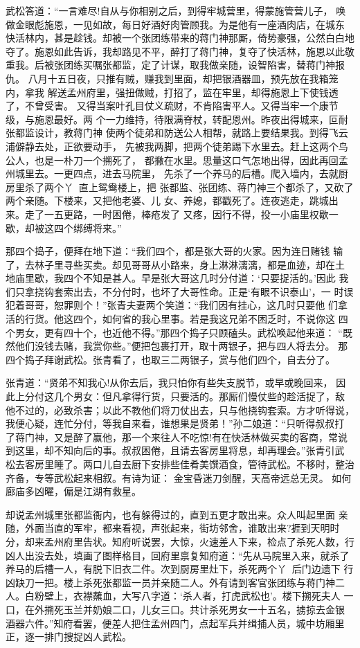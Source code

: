 武松答道：“一言难尽!自从与你相别之后，到得牢城营里，得蒙施管营儿子，
唤做金眼彪施恩，一见如故，每日好酒好肉管顾我。为是他有一座酒肉店，在城东
快活林内，甚是趁钱。却被一个张团练带来的蒋门神那厮，倚势豪强，公然白白地
夺了。施恩如此告诉，我却路见不平，醉打了蒋门神，复夺了快活林，施恩以此敬
重我。后被张团练买嘱张都监，定了计谋，取我做亲随，设智陷害，替蒋门神报仇。
八月十五日夜，只推有贼，赚我到里面，却把银酒器皿，预先放在我箱笼内，拿我
解送孟州府里，强扭做贼，打招了，监在牢里，却得施恩上下使钱透了，不曾受害。
又得当案叶孔目仗义疏财，不肯陷害平人。又得当牢一个康节级，与施恩最好。两
个一力维持，待限满脊杖，转配恩州。昨夜出得城来，叵耐张都监设计，教蒋门神
使两个徒弟和防送公人相帮，就路上要结果我。到得飞云浦僻静去处，正欲要动手，
先被我两脚，把两个徒弟踢下水里去。赶上这两个鸟公人，也是一朴刀一个搠死了，
都撇在水里。思量这口气怎地出得，因此再回孟州城里去。一更四点，进去马院里，
先杀了一个养马的后槽。爬入墙内，去就厨房里杀了两个丫，直上鸳鸯楼上，把
张都监、张团练、蒋门神三个都杀了，又砍了两个亲随。下楼来，又把他老婆、儿
女、养媳，都戳死了。连夜逃走，跳城出来。走了一五更路，一时困倦，棒疮发了
又疼，因行不得，投一小庙里权歇一歇，却被这四个绑缚将来。”

那四个捣子，便拜在地下道：“我们四个，都是张大哥的火家。因为连日赌钱
输了，去林子里寻些买卖。却见哥哥从小路来，身上淋淋漓漓，都是血迹，却在土
地庙里歇，我四个不知是甚人。早是张大哥这几时分付道：‘只要捉活的。’因此
我们只拿挠钩套索出去，不分付时，也坏了大哥性命。正是‘有眼不识泰山’，一
时误犯着哥哥，恕罪则个！”张青夫妻两个笑道：“我们因有挂心，这几时只要他
们拿活的行货。他这四个，如何省的我心里事。若是我这兄弟不困乏时，不说你这
四个男女，更有四十个，也近他不得。”那四个捣子只顾磕头。武松唤起他来道：
“既然他们没钱去赌，我赏你些。”便把包裹打开，取十两银子，把与四人将去分。
那四个捣子拜谢武松。张青看了，也取三二两银子，赏与他们四个，自去分了。

张青道：“贤弟不知我心!从你去后，我只怕你有些失支脱节，或早或晚回来，
因此上分付这几个男女：但凡拿得行货，只要活的。那厮们慢仗些的趁活捉了，敌
他不过的，必致杀害；以此不教他们将刀仗出去，只与他挠钩套索。方才听得说，
我便心疑，连忙分付，等我自来看，谁想果是贤弟！”孙二娘道：“只听得叔叔打
了蒋门神，又是醉了赢他，那一个来往人不吃惊!有在快活林做买卖的客商，常说
到这里，却不知向后的事。叔叔困倦，且请去客房里将息，却再理会。”张青引武
松去客房里睡了。两口儿自去厨下安排些佳肴美馔酒食，管待武松。不移时，整治
齐备，专等武松起来相叙。有诗为证：
金宝昏迷刀剑醒，天高帝远总无灵。
如何廊庙多凶曜，偏是江湖有救星。

却说孟州城里张都监衙内，也有躲得过的，直到五更才敢出来。众人叫起里面
亲随，外面当直的军牢，都来看视，声张起来，街坊邻舍，谁敢出来?捱到天明时
分，却来孟州府里告状。知府听说罢，大惊，火速差人下来，检点了杀死人数，行
凶人出没去处，填画了图样格目，回府里禀复知府道：“先从马院里入来，就杀了
养马的后槽一人，有脱下旧衣二件。次到厨房里灶下，杀死两个丫，后门边遗下
行凶缺刀一把。楼上杀死张都监一员并亲随二人。外有请到客官张团练与蒋门神二
人。白粉壁上，衣襟蘸血，大写八字道：‘杀人者，打虎武松也’。楼下搠死夫人
一口，在外搠死玉兰并奶娘二口，儿女三口。共计杀死男女一十五名，掳掠去金银
酒器六件。”知府看罢，便差人把住孟州四门，点起军兵并缉捕人员，城中坊厢里
正，逐一排门搜捉凶人武松。

